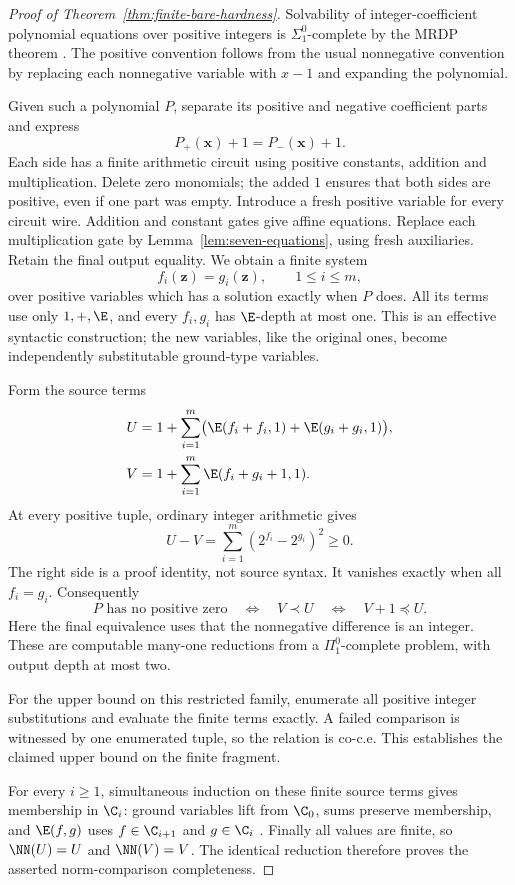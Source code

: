 \documentclass[11pt]{article}
\begin{document}
\begin{proof}[Proof of Theorem~\ref{thm:finite-bare-hardness}]
Solvability of integer-coefficient polynomial equations over positive
integers is $\Sigma^0_1$-complete by the MRDP theorem
\cite{Matiyasevich}. The positive convention follows from the usual
nonnegative convention by replacing each nonnegative variable with
$x-1$ and expanding the polynomial.

Given such a polynomial $P$, separate its positive and negative
coefficient parts and express
\[
 P_+(\mathbf x)+1=P_-(\mathbf x)+1.
\]
Each side has a finite arithmetic circuit using positive constants,
addition and multiplication. Delete zero monomials; the added $1$
ensures that both sides are positive, even if one part was empty.
Introduce a fresh positive variable for every circuit wire. Addition
and constant gates give affine equations. Replace each multiplication
gate by Lemma~\ref{lem:seven-equations}, using fresh auxiliaries.
Retain the final output equality. We obtain a finite system
\[
 f_i(\mathbf z)=g_i(\mathbf z),\qquad 1\le i\le m,
\]
over positive variables which has a solution exactly when $P$ does.
All its terms use only $1,+,\E$, and every $f_i,g_i$ has
$\E$-depth at most one. This is an effective syntactic construction;
the new variables, like the original ones, become independently
substitutable ground-type variables.

Form the source terms
\begin{align*}
 U&=1+\sum_{i=1}^{m}
       \bigl(\E(f_i+f_i,1)+\E(g_i+g_i,1)\bigr),\\
 V&=1+\sum_{i=1}^{m}\E(f_i+g_i+1,1).
\end{align*}
At every positive tuple, ordinary integer arithmetic gives
\begin{equation}\label{eq:finite-gap}
 U-V=\sum_{i=1}^{m}\left(2^{f_i}-2^{g_i}\right)^2\ge0.
\end{equation}
The right side is a proof identity, not source syntax. It vanishes
exactly when all $f_i=g_i$. Consequently
\[
 P\text{ has no positive zero}
 \quad\Longleftrightarrow\quad V\prec U
 \quad\Longleftrightarrow\quad V+1\preceq U.
\]
Here the final equivalence uses that the nonnegative difference is an
integer. These are computable many-one reductions from a
$\Pi^0_1$-complete problem, with output depth at most two.

For the upper bound on this restricted family, enumerate all positive
integer substitutions and evaluate the finite terms exactly. A failed
comparison is witnessed by one enumerated tuple, so the relation is
co-c.e. This establishes the claimed upper bound on the finite fragment.

For every $i\ge1$, simultaneous induction on these finite source terms
gives membership in $\C_i$: ground variables lift from $\C_0$, sums
preserve membership, and $\E(f,g)$ uses $f\in\C_{i+1}$ and
$g\in\C_i$ \cite[Definition~2.9]{WW}. Finally all values are finite,
so $\NN(U)=U$ and $\NN(V)=V$. The identical reduction therefore
proves the asserted norm-comparison completeness.
\end{proof}
\end{document}

